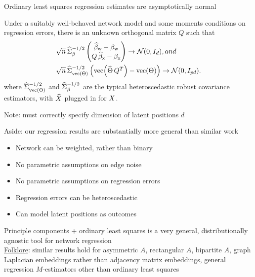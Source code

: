 \documentclass[aspectratio=169]{beamer}
\theoremstyle{remark}
\begin{document}
\begin{frame}{Ordinary least squares regression estimates are asymptotically normal}
    \begin{theorem}
        Under a suitably well-behaved network model and some moments conditions on regression errors, there is an unknown orthogonal matrix $Q$ such that
        \begin{equation*}
            \begin{aligned}
                \sqrt{ n } \,
                 & \Sigmahatbeta^{-1/2}
                \begin{pmatrix}
                    \betawhat - \betaw \\
                    Q \, \betaxhat - \betax
                \end{pmatrix}
                \to
                \Normal{0}{I_d}, and     \\
                \sqrt{ n } \,
                 & \Sigmahattheta^{-1/2}
                \begin{pmatrix}
                    \vecc \paren*{\Thetahat \, Q^T} - \Thetavec
                \end{pmatrix}
                \to
                \Normal{0}{I_{p d}}.
            \end{aligned}
        \end{equation*}
        \noindent where $\widehat{\Sigma}_{\operatorname*{vec} \left(\Theta\right)}^{-1/2}$ and $\widehat{\Sigma}_\beta^{-1/2}$ are the typical heteroscedastic robust covariance estimators, with $\widehat{X}$ plugged in for $X$.
    \end{theorem}

    \centering
    Note: must correctly specify dimension of latent positions $d$
\end{frame}

\begin{frame}{Aside: our regression results are substantially more general than similar work}
    \begin{itemize}
        \item Network can be weighted, rather than binary
        \item No parametric assumptions on edge noise
        \item No parametric assumptions on regression errors
        \item Regression errors can be heteroscedastic
        \item Can model latent positions as outcomes
    \end{itemize}
    Principle components + ordinary least squares is a very general, distributionally agnostic tool for network regression \\
    \vspace{2mm}
    \underline{Folklore}: similar results hold for asymmetric $A$, rectangular $A$, bipartite $A$, graph Laplacian embeddings rather than adjacency matrix embeddings, general regression $M$-estimators other than ordinary least squares
\end{frame}
\end{document}
